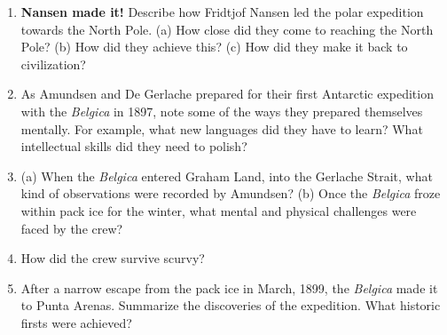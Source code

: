 \documentclass{article}
\begin{document}
\begin{enumerate}
\item \textbf{Nansen made it!}  Describe how Fridtjof Nansen led the polar expedition towards the North Pole.  (a) How close did they come to reaching the North Pole? (b) How did they achieve this? (c) How did they make it back to civilization? \\ \vspace{2cm}
\item As Amundsen and De Gerlache prepared for their first Antarctic expedition with the \textit{Belgica} in 1897, note some of the ways they prepared themselves mentally.  For example, what new languages did they have to learn?  What intellectual skills did they need to polish? \\ \vspace{2cm}
\item (a) When the \textit{Belgica} entered Graham Land, into the Gerlache Strait, what kind of observations were recorded by Amundsen? (b) Once the \textit{Belgica} froze within pack ice for the winter, what mental and physical challenges were faced by the crew? \\ \vspace{1.5cm}
\item How did the crew survive scurvy? \\ \vspace{1.5cm}
\item After a narrow escape from the pack ice in March, 1899, the \textit{Belgica} made it to Punta Arenas.  Summarize the discoveries of the expedition.  What historic firsts were achieved?
\end{enumerate}
\end{document}
